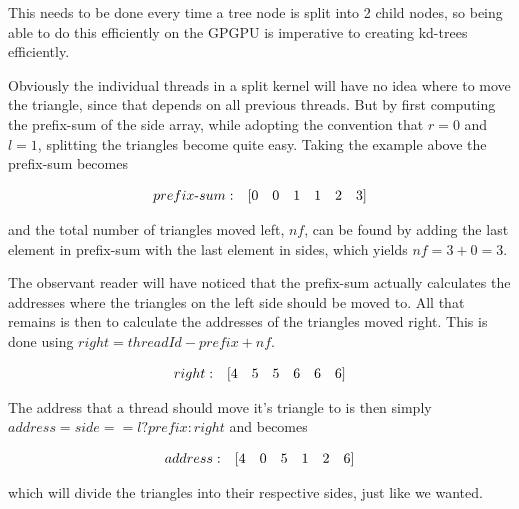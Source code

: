 This needs to be done every time a tree node is split into 2 child
nodes, so being able to do this efficiently on the GPGPU is imperative
to creating kd-trees efficiently.

Obviously the individual threads in a split kernel will have no idea
where to move the triangle, since that depends on all previous
threads. But by first computing the prefix-sum of the side array,
while adopting the convention that $r = 0$ and $l = 1$, splitting the
triangles become quite easy. Taking the example above the prefix-sum
becomes

\begin{displaymath}
  \begin{array} {r r r r r r r}
    prefix\text{-}sum: & [0 & 0 & 1 & 1 & 2 & 3]
  \end{array}
\end{displaymath}

and the total number of triangles moved left, $nf$, can be found by
adding the last element in prefix-sum with the last element in sides,
which yields $nf = 3 + 0 = 3$.

The observant reader will have noticed that the prefix-sum actually
calculates the addresses where the triangles on the left side should
be moved to. All that remains is then to calculate the addresses of
the triangles moved right. This is done using $right = threadId -
prefix + nf$.

\begin{displaymath}
  \begin{array} {r r r r r r r}
    right: & [4 & 5 & 5 & 6 & 6 & 6]
  \end{array}
\end{displaymath}

The address that a thread should move it's triangle to is then simply
$address = side == l ? prefix : right$ and becomes


\begin{displaymath}
  \begin{array} {r r r r r r r}
    address: & [4 & 0 & 5 & 1 & 2 & 6]
  \end{array}
\end{displaymath}

which will divide the triangles into their respective sides, just like
we wanted.






